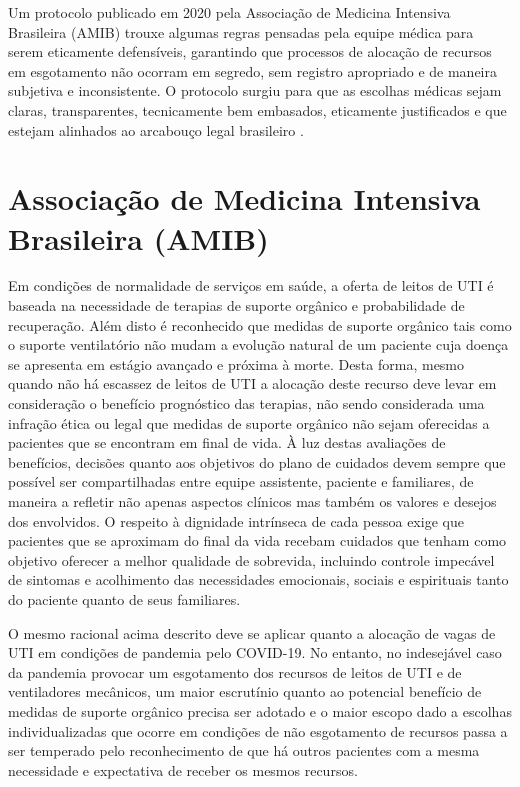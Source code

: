 \documentclass[12pt]{article}
\begin{document}
Um protocolo publicado em 2020 pela Associação de Medicina Intensiva Brasileira (AMIB) trouxe algumas regras pensadas pela equipe médica para serem eticamente defensíveis, garantindo que processos de alocação de recursos em esgotamento não ocorram em segredo, sem registro apropriado e de maneira subjetiva e inconsistente. O protocolo surgiu para que as escolhas médicas sejam claras, transparentes, tecnicamente bem embasados, eticamente justificados e que estejam alinhados ao arcabouço legal brasileiro \cite{kretzer2020protocolo}.


\section{Associação de Medicina Intensiva Brasileira (AMIB)}

Em condições de normalidade de serviços em saúde, a oferta de leitos de UTI é baseada na necessidade de terapias de suporte orgânico e probabilidade de recuperação. Além disto é reconhecido que medidas de suporte orgânico tais como o suporte ventilatório não mudam a evolução natural de um paciente cuja doença se apresenta em estágio avançado e próxima à morte. Desta forma, mesmo quando não há escassez de leitos de UTI a alocação deste recurso deve levar em consideração o benefício prognóstico das terapias, não sendo considerada uma infração ética ou legal que medidas de suporte orgânico não sejam oferecidas a pacientes que se encontram em final de vida. 
À luz destas avaliações de benefícios, decisões quanto aos objetivos do plano de cuidados devem sempre que possível ser compartilhadas entre equipe assistente, paciente e familiares, de maneira a refletir não apenas aspectos clínicos mas também os valores e desejos dos envolvidos. 
O respeito à dignidade intrínseca de cada pessoa exige que pacientes que se aproximam do final da vida recebam cuidados que tenham como objetivo oferecer a melhor qualidade de sobrevida, incluindo controle impecável de sintomas e acolhimento das necessidades emocionais, sociais e espirituais tanto do paciente quanto de seus familiares.

O mesmo racional acima descrito deve se aplicar quanto a alocação de vagas de UTI em condições
de pandemia pelo COVID-19. No entanto, no indesejável caso da pandemia provocar um esgotamento dos recursos de leitos de UTI e de ventiladores mecânicos, um maior escrutínio quanto ao potencial benefício de medidas de suporte orgânico precisa ser adotado e o maior escopo dado a escolhas individualizadas que ocorre em condições de não esgotamento de recursos passa a ser temperado pelo reconhecimento de que há outros pacientes com a mesma necessidade e expectativa de receber os mesmos recursos.
\end{document}
